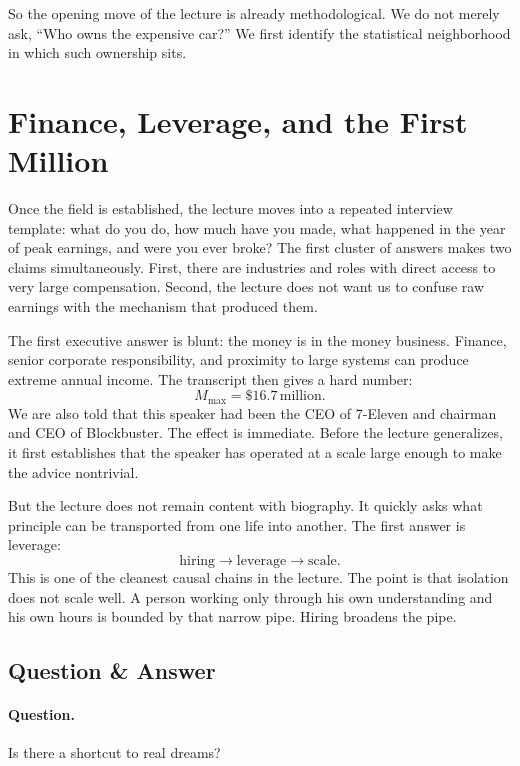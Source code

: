 So the opening move of the lecture is already methodological. We do not merely ask, ``Who owns the expensive car?'' We first identify the statistical neighborhood in which such ownership sits.

\section{Finance, Leverage, and the First Million}

Once the field is established, the lecture moves into a repeated interview template: what do you do, how much have you made, what happened in the year of peak earnings, and were you ever broke? The first cluster of answers makes two claims simultaneously. First, there are industries and roles with direct access to very large compensation. Second, the lecture does not want us to confuse raw earnings with the mechanism that produced them.

The first executive answer is blunt: the money is in the money business. Finance, senior corporate responsibility, and proximity to large systems can produce extreme annual income. The transcript then gives a hard number:
\begin{equation}
M_{\max}=\$16.7\,\text{million}.
\end{equation}
We are also told that this speaker had been the CEO of 7-Eleven and chairman and CEO of Blockbuster. The effect is immediate. Before the lecture generalizes, it first establishes that the speaker has operated at a scale large enough to make the advice nontrivial.

But the lecture does not remain content with biography. It quickly asks what principle can be transported from one life into another. The first answer is leverage:
\begin{equation}
\text{hiring} \rightarrow \text{leverage} \rightarrow \text{scale}.
\end{equation}
This is one of the cleanest causal chains in the lecture. The point is that isolation does not scale well. A person working only through his own understanding and his own hours is bounded by that narrow pipe. Hiring broadens the pipe.

\subsection{Question \& Answer}

\paragraph{Question.} Is there a shortcut to real dreams?

